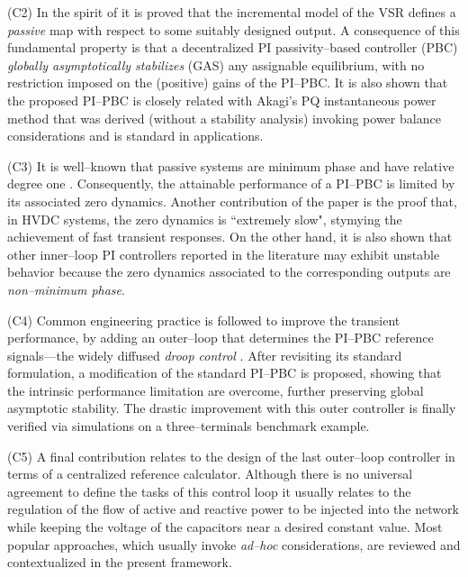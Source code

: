 \documentclass[5p,twocolumn]{elsarticle}
\numberwithin{equation}{section}
\begin{document}
\item[(C2)] In the spirit of \cite{HERetal,JAYetal,SANVER} it is proved that the incremental model of the VSR defines a {\em passive} map
with respect to some suitably designed output. A consequence of this fundamental property is that a decentralized PI passivity--based controller (PBC) {\em globally asymptotically stabilizes} (GAS) any assignable
equilibrium, with no restriction imposed on the (positive) gains of the PI--PBC. It is also shown that the proposed PI--PBC is closely related with Akagi's PQ instantaneous power method \cite{akagi} that was
derived (without a stability analysis) invoking power balance considerations and is standard in applications.

\item[(C3)] It is well--known that passive systems are minimum phase and have relative degree one \cite{BYRISIWIL,VAN}. Consequently, the attainable performance of a PI--PBC is limited by its associated zero dynamics. Another contribution of the paper is the proof that, in HVDC systems, the zero dynamics is ``extremely slow", stymying the achievement of fast transient responses. On the other hand, it is also shown that other inner--loop PI controllers reported in the literature may exhibit unstable behavior because the zero dynamics associated to the corresponding outputs are {\em non--minimum phase}.

\item[(C4)] Common engineering practice is followed to improve the transient performance, by adding an outer--loop that determines the PI--PBC reference signals---the widely diffused \textit{droop control} \cite{sandberg,sun}. After revisiting its standard formulation, a modification of the standard PI--PBC is proposed, showing that the intrinsic performance limitation are overcome, further preserving global asymptotic stability. The drastic improvement with this outer controller is finally verified via simulations on a three--terminals benchmark example. 


\item[(C5)] A final contribution relates to the design of the last outer--loop controller in terms of a centralized reference calculator. Although there is no universal agreement to define the tasks of this control loop it usually relates to the regulation of the flow of active and reactive power to be injected into the network while keeping the voltage of the capacitors near a desired constant value. Most popular approaches, which usually invoke {\em ad--hoc} considerations, are reviewed and contextualized in the present framework.
\end{document}
